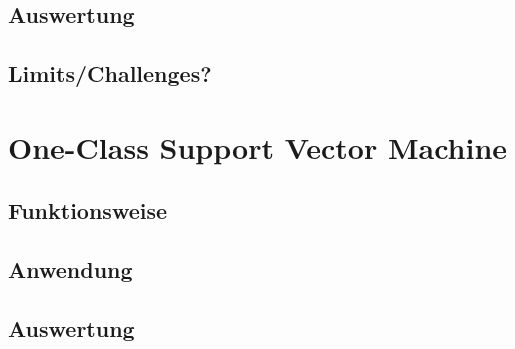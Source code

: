 \subsection{Auswertung}
\subsection{Limits/Challenges?}

\newpage

\section{One-Class Support Vector Machine}
\subsection{Funktionsweise}
\subsection{Anwendung}
\subsection{Auswertung}
